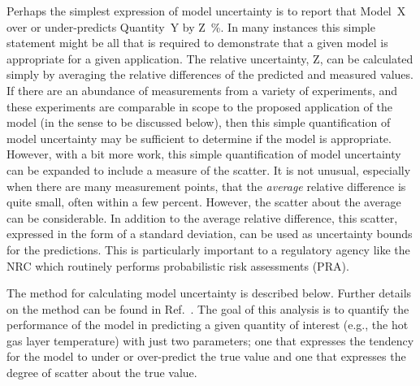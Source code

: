 \documentclass[fleqn,b5paper]{article}
\begin{document}
Perhaps the simplest expression of model uncertainty is to report that Model~X over or under-predicts Quantity~Y by Z~\%. In many instances this simple statement might be all that is required to demonstrate that a given model is appropriate for a given application. The relative uncertainty, Z, can be calculated simply by averaging the relative differences of the predicted and measured values. If there are an abundance of measurements from a variety of experiments, and these experiments are comparable in scope to the proposed application of the model (in the sense to be discussed below), then this simple quantification of model uncertainty may be sufficient to determine if the model is appropriate. However, with a bit more work, this simple quantification of model uncertainty can be expanded to include a measure of the scatter. It is not unusual, especially when there are many measurement points, that the {\em average} relative difference is quite small, often within a few percent. However, the scatter about the average can be considerable. In addition to the average relative difference, this scatter, expressed in the form of a standard deviation, can be used as uncertainty bounds for the predictions. This is particularly important to a regulatory agency like the NRC which routinely performs probabilistic risk assessments (PRA).

The method for calculating model uncertainty is described below. Further details on the method can be found in Ref.~\cite{McGrattan:Metrologia}. The goal of this analysis is to quantify the performance of the model in predicting a given quantity of interest (e.g., the hot gas layer temperature) with just two parameters; one that expresses the tendency for the model to under or over-predict the true value and one that expresses the degree of scatter about the true value.
\end{document}
